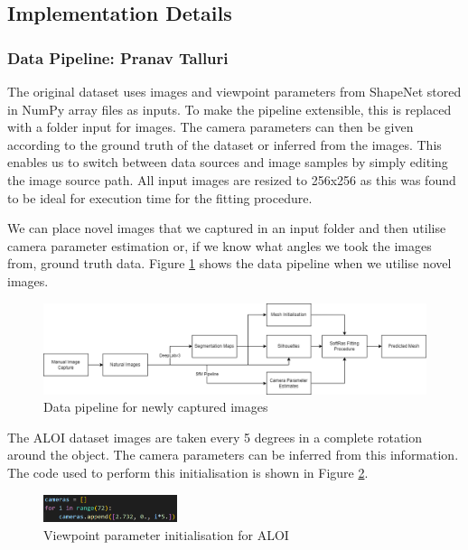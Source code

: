 \documentclass{article}
\begin{document}
\subsection{Implementation Details}

\subsubsection{Data Pipeline: Pranav Talluri}
\label{section:datapipe}

The original dataset uses images and viewpoint parameters from ShapeNet stored in NumPy array files as inputs. To make the pipeline extensible, this is replaced with a folder input for images. The camera parameters can then be given according to the ground truth of the dataset or inferred from the images. This enables us to switch between data sources and image samples by simply editing the image source path. All input images are resized to 256x256 as this was found to be ideal for execution time for the fitting procedure.

We can place novel images that we captured in an input folder and then utilise camera parameter estimation or, if we know what angles we took the images from, ground truth data. Figure \ref{natdatapipe} shows the data pipeline when we utilise novel images.

\begin{figure}[h!]
  \centering
  \includegraphics[width=\textwidth]{images/natdatapipeline.png}
  \caption{Data pipeline for newly captured images}
  \label{natdatapipe}
\end{figure}

The ALOI dataset images are taken every 5 degrees in a complete rotation around the object. The camera parameters can be inferred from this information. The code used to perform this initialisation is shown in Figure \ref{camerainitaloi}.

\begin{figure}[h!]
  \centering
  \includegraphics[width=0.35\textwidth]{images/initcamera.png}
  \caption{Viewpoint parameter initialisation for ALOI}
  \label{camerainitaloi}
\end{figure}
\end{document}
